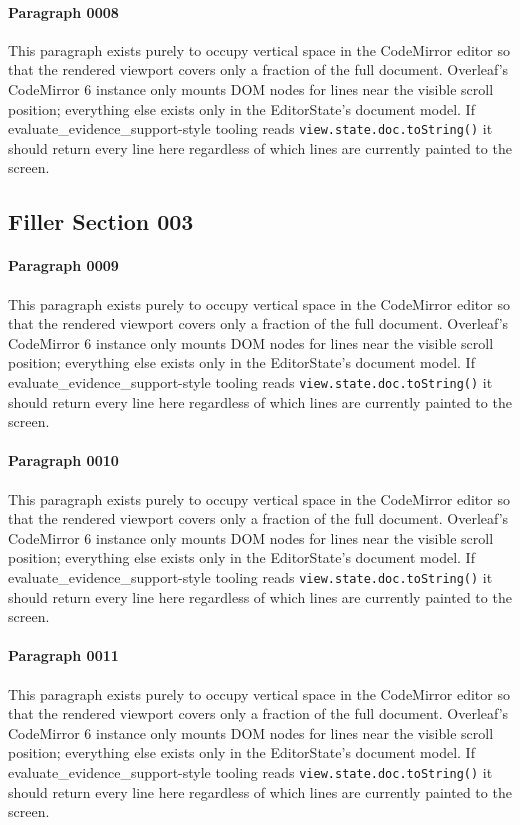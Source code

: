 \documentclass{article}
\begin{document}
\paragraph{Paragraph 0008}
This paragraph exists purely to occupy vertical space in the CodeMirror editor so that the rendered viewport covers only a fraction of the full document. Overleaf's CodeMirror 6 instance only mounts DOM nodes for lines near the visible scroll position; everything else exists only in the EditorState's document model. If evaluate\_evidence\_support-style tooling reads \texttt{view.state.doc.toString()} it should return every line here regardless of which lines are currently painted to the screen.

\subsection{Filler Section 003}
\paragraph{Paragraph 0009}
This paragraph exists purely to occupy vertical space in the CodeMirror editor so that the rendered viewport covers only a fraction of the full document. Overleaf's CodeMirror 6 instance only mounts DOM nodes for lines near the visible scroll position; everything else exists only in the EditorState's document model. If evaluate\_evidence\_support-style tooling reads \texttt{view.state.doc.toString()} it should return every line here regardless of which lines are currently painted to the screen.

\paragraph{Paragraph 0010}
This paragraph exists purely to occupy vertical space in the CodeMirror editor so that the rendered viewport covers only a fraction of the full document. Overleaf's CodeMirror 6 instance only mounts DOM nodes for lines near the visible scroll position; everything else exists only in the EditorState's document model. If evaluate\_evidence\_support-style tooling reads \texttt{view.state.doc.toString()} it should return every line here regardless of which lines are currently painted to the screen.

\paragraph{Paragraph 0011}
This paragraph exists purely to occupy vertical space in the CodeMirror editor so that the rendered viewport covers only a fraction of the full document. Overleaf's CodeMirror 6 instance only mounts DOM nodes for lines near the visible scroll position; everything else exists only in the EditorState's document model. If evaluate\_evidence\_support-style tooling reads \texttt{view.state.doc.toString()} it should return every line here regardless of which lines are currently painted to the screen.
\end{document}

